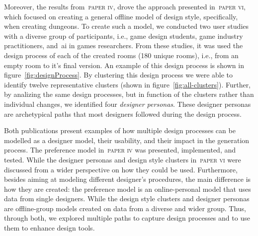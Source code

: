
Moreover, the results from~\textsc{paper iv}, drove the approach presented in~\textsc{paper vi}, which focused on creating a general offline model of design style, specifically, when creating dungeons. To create such a model, we conducted two user studies with a diverse group of participants, i.e., game design students, game industry practitioners, and~\acrshort{ai} in games researchers. From these studies, it was used the design process of each of the created rooms (180 unique rooms), i.e., from an empty room to it's final version. An example of this design process is shown in figure~\ref{fig:designProcess}. By clustering this design process we were able to identify twelve representative clusters (shown in figure~\ref{fig:all-clusters}). Further, by analizing the same design processes, but in function of the clusters rather than individual changes, we identified four \emph{designer personas}. These designer personas are archetypical paths that most designers followed during the design process.



Both publications present examples of how multiple design processes can be modelled as a designer model, their usability, and their impact in the generation process. The preference model in~\textsc{paper iv} was presented, implemented, and tested. While the designer personas and design style clusters in~\textsc{paper vi} were discussed from a wider perspective on how they could be used. Furthermore, besides aiming at modeling different designer's procedures, the main difference is how they are created: the preference model is an online-personal model that uses data from single designers. While the design style clusters and designer personas are offline-group models created on data from a diverse and wider group. Thus, through both, we explored multiple paths to capture design processes and to use them to enhance design tools.


